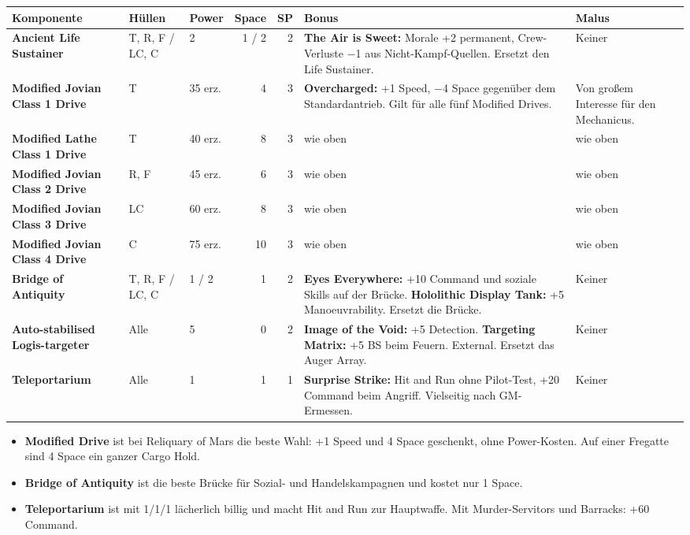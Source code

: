 \documentclass[9pt,a4paper]{extarticle}
\newcommand{\plus}[1]{\textcolor{good}{#1}}
\newcommand{\nm}[1]{\textbf{#1}}
\newcommand{\eff}[1]{\textbf{#1:}}
\newenvironment{urteil}{\begin{tcolorbox}[colback=brasssoft,colframe=brass,boxrule=0pt,leftrule=2pt,arc=0pt,left=6pt,right=6pt,top=4pt,bottom=4pt,before skip=6pt,after skip=10pt,title={\monofont\scriptsize\bfseries\color{brass}URTEIL},coltitle=brass,colbacktitle=brasssoft,toptitle=2pt,bottomtitle=0pt,attach title to upper=\par]\begin{itemize}[leftmargin=10pt,itemsep=1pt,parsep=0pt,topsep=2pt]}{\end{itemize}\end{tcolorbox}}
\begin{document}
\begin{xltabular}{\linewidth}{l H P N N Y Y}
\toprule
{}\textbf{Komponente} & \textbf{Hüllen} & \textbf{Power} & \textbf{Space} & \textbf{SP} & \textbf{Bonus} & \textbf{Malus}\\
\midrule
\endhead
\nm{Ancient Life Sustainer} & T, R, F / LC, C & 2 & 1 / 2 & 2 & \eff{The Air is Sweet} \plus{Morale +2} permanent, \plus{Crew-Verluste −1} aus Nicht-Kampf-Quellen. Ersetzt den Life Sustainer. & Keiner\\
\nm{Modified Jovian Class 1 Drive} & T & 35 erz. & 4 & 3 & \eff{Overcharged} \plus{+1 Speed}, \plus{−4 Space} gegenüber dem Standardantrieb. Gilt für alle fünf Modified Drives. & Von großem Interesse für den Mechanicus.\\
\nm{Modified Lathe Class 1 Drive} & T & 40 erz. & 8 & 3 & wie oben & wie oben\\
\nm{Modified Jovian Class 2 Drive} & R, F & 45 erz. & 6 & 3 & wie oben & wie oben\\
\nm{Modified Jovian Class 3 Drive} & LC & 60 erz. & 8 & 3 & wie oben & wie oben\\
\nm{Modified Jovian Class 4 Drive} & C & 75 erz. & 10 & 3 & wie oben & wie oben\\
\nm{Bridge of Antiquity} & T, R, F / LC, C & 1 / 2 & 1 & 2 & \eff{Eyes Everywhere} \plus{+10 Command und soziale Skills} auf der Brücke. \eff{Hololithic Display Tank} \plus{+5 Manoeuvrability}. Ersetzt die Brücke. & Keiner\\
\nm{Auto-stabilised Logis-targeter} & Alle & 5 & 0 & 2 & \eff{Image of the Void} \plus{+5 Detection}. \eff{Targeting Matrix} \plus{+5 BS} beim Feuern. External. Ersetzt das Auger Array. & Keiner\\
\nm{Teleportarium} & Alle & 1 & 1 & 1 & \eff{Surprise Strike} Hit and Run ohne Pilot-Test, \plus{+20 Command} beim Angriff. Vielseitig nach GM-Ermessen. & Keiner\\
\bottomrule
\end{xltabular}

\begin{urteil}
\item \nm{Modified Drive} ist bei Reliquary of Mars die beste Wahl: +1 Speed und 4 Space geschenkt, ohne Power-Kosten. Auf einer Fregatte sind 4 Space ein ganzer Cargo Hold.
\item \nm{Bridge of Antiquity} ist die beste Brücke für Sozial- und Handelskampagnen und kostet nur 1 Space.
\item \nm{Teleportarium} ist mit 1/1/1 lächerlich billig und macht Hit and Run zur Hauptwaffe. Mit Murder-Servitors und Barracks: +60 Command.
\end{urteil}
\end{document}
